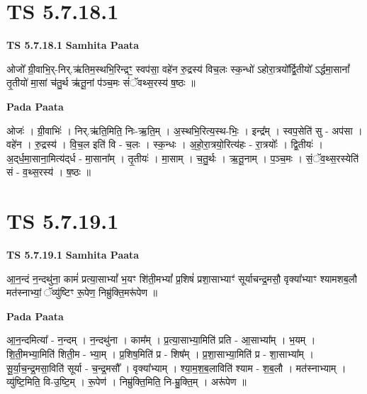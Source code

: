 \documentclass[17pt]{extarticle}
\begin{document}

\section{ TS 5.7.18.1 }

\textbf{TS 5.7.18.1 } \newline
\textbf{Samhita Paata} \newline

ओजो᳚ ग्री॒वाभि॒र्-निर्.ऋ॑तिम॒स्थभि॒रिन्द्रꣳ॒॒ स्वप॑सा॒ वहे॑न रु॒द्रस्य॑ विच॒लः स्क॒न्धो॑ ऽहोरा॒त्रयो᳚र्द्वि॒तीयो᳚ ऽर्द्धमा॒सानां᳚ तृ॒तीयो॑ मा॒सां च॑तु॒र्थ ऋ॑तू॒नां प॑ञ्च॒मः सं॑ॅवथ्स॒रस्य॑ ष॒ष्ठः ॥ \newline

\textbf{Pada Paata} \newline

ओजः॑ । ग्री॒वाभिः॑ । निर्.ऋ॑ति॒मिति॒ निः-ऋ॒ति॒म् । अ॒स्थभि॒रित्य॒स्थ-भिः॒ । इन्द्र᳚म् । स्वप॒सेति॑ सु - अप॑सा । वहे॑न । रु॒द्रस्य॑ । वि॒च॒ल इति॑ वि - च॒लः । स्क॒न्धः । अ॒हो॒रा॒त्रयो॒रित्य॑हः - रा॒त्रयोः᳚ । द्वि॒तीयः॑ । अ॒द्‌र्ध॒मा॒साना॒मित्य॑द्‌र्ध - मा॒साना᳚म् । तृ॒तीयः॑ । मा॒साम् । च॒तु॒र्थः । ऋ॒तू॒नाम् । प॒ञ्च॒मः । सं॒ॅव॒थ्स॒रस्येति॑ सं - व॒थ्स॒रस्य॑ । ष॒ष्ठः ॥  \newline





\section{ TS 5.7.19.1 }

\textbf{TS 5.7.19.1 } \newline
\textbf{Samhita Paata} \newline

आ॒न॒न्दं न॒न्दथु॑ना॒ कामं॑ प्रत्या॒साभ्यां᳚ भ॒यꣳ शि॑ती॒मभ्यां᳚ प्र॒शिषं॑ प्रशा॒साभ्याꣳ॑ सूर्याचन्द्र॒मसौ॒ वृक्या᳚भ्याꣳ श्यामशब॒लौ मत॑स्नाभ्यां॒ ॅव्यु॑ष्टिꣳ रू॒पेण॒ निम्रु॑क्ति॒मरू॑पेण ॥ \newline

\textbf{Pada Paata} \newline

आ॒न॒न्दमित्या᳚ - न॒न्दम् । न॒न्दथु॑ना । काम᳚म् । प्र॒त्या॒साभ्या॒मिति॑ प्रति - आ॒साभ्या᳚म् । भ॒यम् । शि॒ती॒मभ्या॒मिति॑ शिती॒म - भ्या॒म् । प्र॒शिष॒मिति॑ प्र - शिष᳚म् । प्र॒शा॒साभ्या॒मिति॑ प्र - शा॒साभ्या᳚म् । सू॒र्या॒च॒न्द्र॒मसा॒विति॑ सूर्या - च॒न्द्र॒मसौ᳚ । वृक्या᳚भ्याम् । श्या॒म॒श॒ब॒लाविति॑ श्याम - श॒ब॒लौ । मत॑स्नाभ्याम् । व्यु॑ष्टि॒मिति॒ वि-उ॒ष्टि॒म् । रू॒पेण॑ । निम्रु॑क्ति॒मिति॒ नि-म्रु॒क्ति॒म् । अरू॑पेण ॥  \newline
\end{document}
